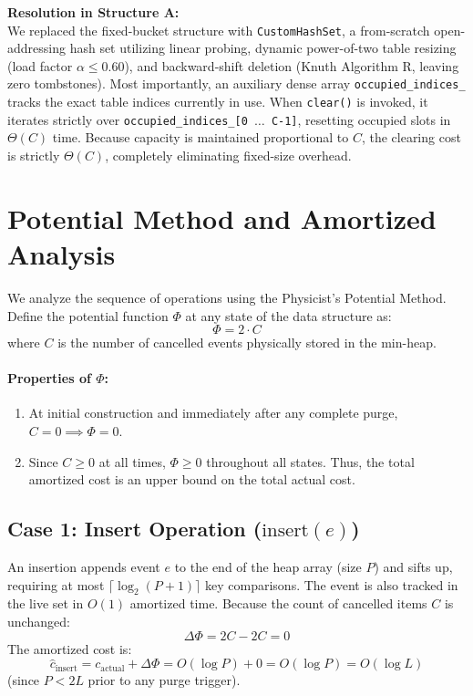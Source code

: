 \documentclass[11pt,a4paper]{article}
\begin{document}
\noindent\textbf{Resolution in Structure A:}\\
We replaced the fixed-bucket structure with \texttt{CustomHashSet}, a from-scratch open-addressing hash set utilizing linear probing, dynamic power-of-two table resizing (load factor $\alpha \le 0.60$), and backward-shift deletion (Knuth Algorithm R, leaving zero tombstones). Most importantly, an auxiliary dense array \texttt{occupied\_indices\_} tracks the exact table indices currently in use. When \texttt{clear()} is invoked, it iterates strictly over \texttt{occupied\_indices\_[0 $\dots$ C-1]}, resetting occupied slots in $\Theta(C)$ time. Because capacity is maintained proportional to $C$, the clearing cost is strictly $\Theta(C)$, completely eliminating fixed-size overhead.

\section{Potential Method and Amortized Analysis}
We analyze the sequence of operations using the Physicist's Potential Method. Define the potential function $\Phi$ at any state of the data structure as:
\begin{equation}
\Phi = 2 \cdot C
\end{equation}
where $C$ is the number of cancelled events physically stored in the min-heap.

\paragraph{Properties of $\Phi$:}
\begin{enumerate}
    \item At initial construction and immediately after any complete purge, $C = 0 \implies \Phi = 0$.
    \item Since $C \ge 0$ at all times, $\Phi \ge 0$ throughout all states. Thus, the total amortized cost is an upper bound on the total actual cost.
\end{enumerate}

\subsection{Case 1: Insert Operation ($\text{insert}(e)$)}
An insertion appends event $e$ to the end of the heap array (size $P$) and sifts up, requiring at most $\lceil \log_2(P + 1) \rceil$ key comparisons. The event is also tracked in the live set in $O(1)$ amortized time. Because the count of cancelled items $C$ is unchanged:
\begin{equation}
\Delta\Phi = 2C - 2C = 0
\end{equation}
The amortized cost is:
\begin{equation}
\widehat{c}_{\text{insert}} = c_{\text{actual}} + \Delta\Phi = O(\log P) + 0 = O(\log P) = O(\log L)
\end{equation}
(since $P < 2L$ prior to any purge trigger).
\end{document}
